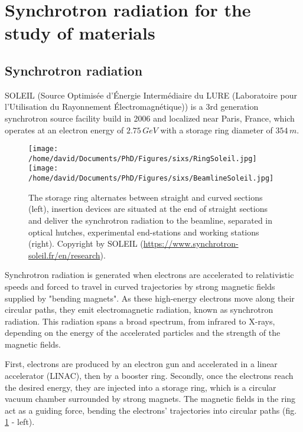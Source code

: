 \newpage
\section{Synchrotron radiation for the study of materials} \label{sec:SIXS}

\subsection{Synchrotron radiation}

SOLEIL (Source Optimisée d’Énergie Intermédiaire du LURE (Laboratoire pour l’Utilisation du Rayonnement Électromagnétique)) is a 3rd generation synchrotron source facility build in 2006 and localized near Paris, France, which operates at an electron energy of $2.75 \, GeV$ with a storage ring diameter of $354 \, m$.

\begin{figure}[!htb]
    \centering
    \texttt{[image: /home/david/Documents/PhD/Figures/sixs/RingSoleil.jpg]}
    \texttt{[image: /home/david/Documents/PhD/Figures/sixs/BeamlineSoleil.jpg]}
    \caption{
    	The storage ring alternates between straight and curved sections (left), insertion devices are situated at the end of straight sections and deliver the synchrotron radiation to the beamline, separated in optical hutches, experimental end-stations and working stations (right).
    	Copyright by SOLEIL (\url{https://www.synchrotron-soleil.fr/en/research}).
    }
    \label{fig:SOLEIL}
\end{figure}

Synchrotron radiation is generated when electrons are accelerated to relativistic speeds and forced to travel in curved trajectories by strong magnetic fields supplied by "bending magnets".
As these high-energy electrons move along their circular paths, they emit electromagnetic radiation, known as synchrotron radiation.
This radiation spans a broad spectrum, from infrared to X-rays, depending on the energy of the accelerated particles and the strength of the magnetic fields.

First, electrons are produced by an electron gun and accelerated in a linear accelerator (LINAC), then by a booster ring.
Secondly, once the electrons reach the desired energy, they are injected into a storage ring, which is a circular vacuum chamber surrounded by strong magnets.
The magnetic fields in the ring act as a guiding force, bending the electrons' trajectories into circular paths (fig. \ref{fig:SOLEIL} - left).

